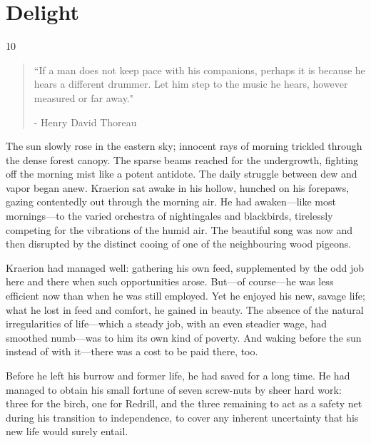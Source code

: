 \chapter{Delight}

\vspace{-1.3cm}
\begin{localsize}{10}
	\begin{quote}
		``If a man does not keep pace with his companions, perhaps it is because he hears a different drummer. Let him step to the music he hears, however measured or far away."
		\begin{flushright}- Henry David Thoreau \end{flushright}
	\end{quote} 
\end{localsize}
\vspace{1cm}

The sun slowly rose in the eastern sky; innocent rays of morning trickled through the dense forest canopy.
The sparse beams reached for the undergrowth, fighting off the morning mist like a potent antidote.
The daily struggle between dew and vapor began anew.
Kraerion sat awake in his hollow, hunched on his forepaws, gazing contentedly out through the morning air.
He had awaken---like most mornings---to the varied orchestra of nightingales and blackbirds, tirelessly competing for the vibrations of the humid air.
The beautiful song was now and then disrupted by the distinct cooing of one of the neighbouring wood pigeons.

Kraerion had managed well: gathering his own feed, supplemented by the odd job here and there when such opportunities arose.
But---of course---he was less efficient now than when he was still employed.
Yet he enjoyed his new, savage life; what he lost in feed and comfort, he gained in beauty.
The absence of the natural irregularities of life---which a steady job, with an even steadier wage, had smoothed numb---was to him its own kind of poverty.
And waking before the sun instead of with it---there was a cost to be paid there, too.

\renewcommand*{\thepage}{\footnotesize \hexadecimal{page}}

Before he left his burrow and former life, he had saved for a long time.
He had managed to obtain his small fortune of seven screw-nuts by sheer hard work: three for the birch, one for Redrill, and the three remaining to act as a safety net during his transition to independence, to cover any inherent uncertainty that his new life would surely entail.

